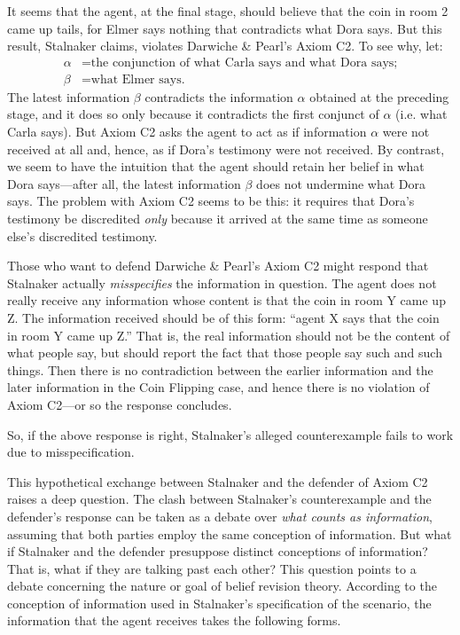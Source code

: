 \ed It seems that the agent, at the final stage, should believe that the coin in room 2 came up tails, for Elmer says nothing that contradicts what Dora says. But this result, Stalnaker claims, violates Darwiche \& Pearl's Axiom C2. To see why, let:
$$
  \begin{aligned}
    \alpha &= \text{the conjunction of what Carla says and what Dora says;}\\
	\beta  &= \text{what Elmer says.}
  \end{aligned}
$$
The latest information $\beta$ contradicts the information $\alpha$ obtained at the preceding stage, and it does so only because it contradicts the first conjunct of $\alpha$ (i.e. what Carla says). But Axiom C2 asks the agent to act as if information $\alpha$ were not received at all and, hence, as if Dora's testimony were not received. By contrast, we seem to have the intuition that the agent should retain her belief in what Dora says---after all, the latest information $\beta$ does not undermine what Dora says. The problem with Axiom C2 seems to be this: it requires that Dora's testimony be discredited {\em only} because it arrived at the same time as someone else's discredited testimony.

Those who want to defend Darwiche \& Pearl's Axiom C2 might respond that Stalnaker actually {\em misspecifies} the information in question. The agent does not really receive any information whose content is that the coin in room Y came up Z. The information received should be of this form: ``agent X says that the coin in room Y came up Z.'' That is, the real information should not be the content of what people say, but should report the fact that those people say such and such things. Then there is no contradiction between the earlier information and the later information in the Coin Flipping case, and hence there is no violation of Axiom C2---or so the response concludes.

So, if the above response is right, Stalnaker's alleged counterexample fails to work due to misspecification. 

This hypothetical exchange between Stalnaker and the defender of Axiom C2 raises a deep question. The clash between Stalnaker's counterexample and the defender's response can be taken as a debate over {\em what counts as information}, assuming that both parties employ the same conception of information. But what if Stalnaker and the defender presuppose distinct conceptions of information? That is, what if they are talking past each other? This question points to a debate concerning the nature or goal of belief revision theory. According to the conception of information used in Stalnaker's specification of the scenario, the information that the agent receives takes the following forms. \op

